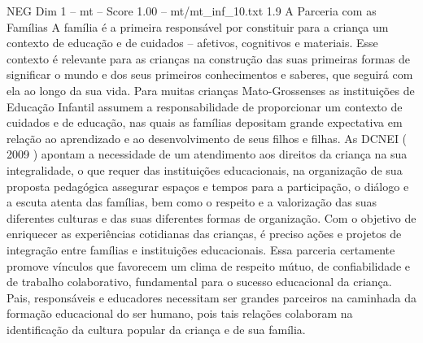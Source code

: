 \begin{textsample}{NEG Dim 1 – mt – Score 1.00 – mt/mt\_inf\_10.txt}  \label{ex:f1_neg_212}
1.9 A Parceria com as Famílias A família é a primeira responsável por constituir para a criança um contexto de educação e de cuidados – afetivos, cognitivos e materiais.
Esse contexto é relevante para as crianças na construção das suas primeiras formas de significar o mundo e dos seus primeiros conhecimentos e saberes, que seguirá com ela ao longo da sua vida.
Para muitas crianças Mato-Grossenses as instituições de Educação Infantil assumem a responsabilidade de proporcionar um contexto de cuidados e de educação, nas quais as famílias depositam grande expectativa em relação ao aprendizado e ao desenvolvimento de seus filhos e filhas.
As DCNEI ( 2009 ) apontam a necessidade de um atendimento aos direitos da criança na sua integralidade, o que requer das instituições educacionais, na organização de sua proposta pedagógica assegurar espaços e tempos para a participação, o diálogo e a escuta atenta das famílias, bem como o respeito e a valorização das suas diferentes culturas e das suas diferentes formas de organização.
Com o objetivo de enriquecer as experiências cotidianas das crianças, é preciso ações e projetos de integração entre famílias e instituições educacionais.
Essa parceria certamente promove vínculos que favorecem um clima de respeito mútuo, de confiabilidade e de trabalho colaborativo, fundamental para o sucesso educacional da criança.
Pais, responsáveis e educadores necessitam ser grandes parceiros na caminhada da formação educacional do ser humano, pois tais relações colaboram na identificação da cultura popular da criança e de sua família.

\end{textsample}

